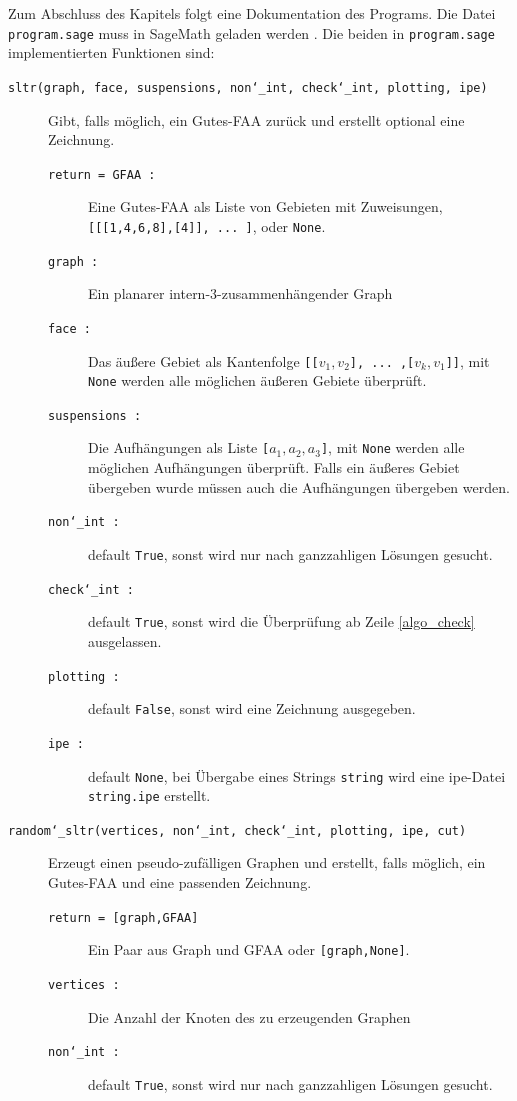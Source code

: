 Zum Abschluss des Kapitels folgt eine Dokumentation des Programs. Die Datei \texttt{program.sage} muss in SageMath geladen werden \cite{sage}. Die beiden in \texttt{program.sage} implementierten Funktionen sind:
\begin{description}
\item[\texttt{sltr(graph, face, suspensions, non\char`_int, check\char`_int, plotting, ipe)}] \hfill 
Gibt, falls möglich, ein Gutes-FAA zurück und erstellt optional eine Zeichnung.
\begin{description}
\item[\texttt{return = GFAA :}] Eine Gutes-FAA als Liste von Gebieten mit Zuweisungen, \texttt{[[[1,4,6,8],[4]], ... ]}, oder \texttt{None}.
\item[\texttt{graph :}] Ein planarer intern-3-zusammenhängender Graph
\item[\texttt{face :}] Das äußere Gebiet als Kantenfolge \texttt{[[$v_1,v_2$], ... ,[$v_k,v_1$]]}, mit \texttt{None} werden alle möglichen äußeren Gebiete überprüft.
\item[\texttt{suspensions :}] Die Aufhängungen als Liste \texttt{[$a_1,a_2,a_3$]}, mit \texttt{None} werden alle möglichen Aufhängungen überprüft. Falls ein äußeres Gebiet übergeben wurde müssen auch die Aufhängungen übergeben werden.
\item[\texttt{non\char`_int :}] default \texttt{True}, sonst wird nur nach ganzzahligen Lösungen gesucht.
\item[\texttt{check\char`_int :}] default \texttt{True}, sonst wird die Überprüfung ab Zeile \ref{algo_check} ausgelassen.
\item[\texttt{plotting :}] default \texttt{False}, sonst wird eine Zeichnung ausgegeben.
\item[\texttt{ipe :}] default \texttt{None}, bei Übergabe eines Strings \texttt{string} wird eine ipe-Datei \texttt{string.ipe} erstellt.
\end{description}
\item[\texttt{random\char`_sltr(vertices, non\char`_int, check\char`_int, plotting, ipe, cut)}] \hfill 
Erzeugt einen pseudo-zufälligen Graphen und erstellt, falls möglich, ein Gutes-FAA und eine passenden Zeichnung.
\begin{description}
\item[\texttt{return = [graph,GFAA]}] Ein Paar aus Graph und GFAA oder \texttt{[graph,None]}.
\item[\texttt{vertices :}] Die Anzahl der Knoten des zu erzeugenden Graphen
\item[\texttt{non\char`_int :}] default \texttt{True}, sonst wird nur nach ganzzahligen Lösungen gesucht.

\end{description}
\end{description}

